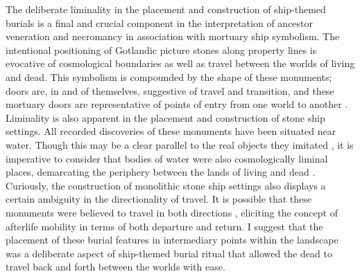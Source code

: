 The deliberate liminality in the placement and construction of ship-themed burials is a final and crucial component in the interpretation of ancestor veneration and necromancy in association with mortuary ship symbolism. The intentional positioning of Gotlandic picture stones along property lines is evocative of cosmological boundaries as well as travel between the worlds of living and dead. This symbolism is compounded by the shape of these monuments; doors are, in and of themselves, suggestive of travel and transition, and these mortuary doors are representative of points of entry from one world to another \parencites[195--196]{Eriksen_2013}{Price_2012a}.
Liminality is also apparent in the placement and construction of stone ship settings. All recorded discoveries of these monuments have been situated near water. Though this may be a clear parallel to the real objects they imitated \parencite[47]{Wallin_2010},
it is imperative to consider that bodies of water were also cosmologically liminal places, demarcating the periphery between the lands of living and dead \parencites[388]{Ballard_2004}{Helskog_1999}[91]{Wehlin_2010}.
Curiously, the construction of monolithic stone ship settings also displays a certain ambiguity in the directionality of travel. It is possible that these monuments were believed to travel in both directions \parencite[89]{Bradley_2010}, eliciting the concept of afterlife mobility in terms of both departure and return. I suggest that the placement of these burial features in intermediary points within the landscape was a deliberate aspect of ship-themed burial ritual that allowed the dead to travel back and forth between the worlds with ease.


